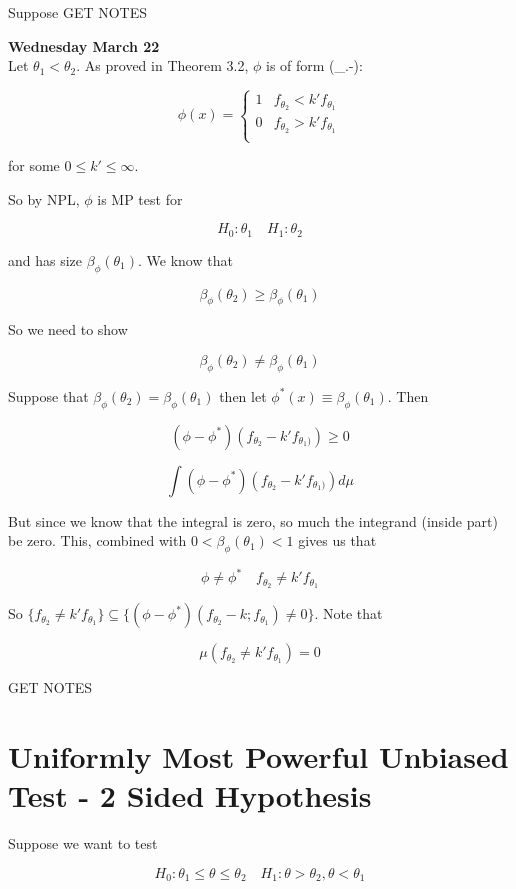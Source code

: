 \documentclass[11pt,fleqn]{book} %
\begin{document}
 Suppose GET NOTES


\textbf{Wednesday March 22}\\

Let $\theta_1 < \theta_2$. As proved in Theorem 3.2, $\phi$ is of form (\_.-):

		$$\phi(x) = \left\{ \begin{array}{ll}
			1 & f_{\theta_2} < k' f_{\theta_1}\\
			0 & f_{\theta_2} > k' f_{\theta_1}\\
		\end{array}\right. $$

for some $0 \leq k' \leq \infty$. 

So by NPL, $\phi$ is MP test for 

		$$H_0: \theta_1 \quad H_1: \theta_2 $$

and has size $\beta_\phi(\theta_1)$. We know that

		$$\beta_\phi(\theta_2) \geq \beta_\phi (\theta_1) $$

So we need to show 

		$$\beta_\phi(\theta_2) \neq \beta_\phi(\theta_1) $$


Suppose that $\beta_\phi(\theta_2) = \beta_\phi(\theta_1) $ then let $\phi^*(x) \equiv \beta_\phi(\theta_1)$. Then

		$$(\phi - \phi^*)(f_{\theta_2} - k' f_{\theta_1)}) \geq 0 $$

		$$\int (\phi - \phi^*)(f_{\theta_2} - k' f_{\theta_1)}) d\mu $$

But since we know that the integral is zero, so much the integrand (inside part) be zero. This, combined with $0 < \beta_\phi(\theta_1) < 1$ gives us that

		$$\phi \neq \phi^* \quad f_{\theta_2} \neq k' f_{\theta_1} $$


So $\{f_{\theta_2} \neq k' f_{\theta_1} \} \subseteq \{(\phi - \phi^*) (f_{\theta_2} - k; f_{\theta_1}) \neq 0 \}$. Note that

		$$\mu(f_{\theta_2} \neq k' f_{\theta_1}) = 0 $$

GET NOTES


\section{Uniformly Most Powerful Unbiased Test - 2 Sided Hypothesis}

Suppose we want to test


		$$H_0: \theta_1 \leq \theta \leq \theta_2 \quad H_1: \theta > \theta_2, \theta < \theta_1  $$
\end{document}
